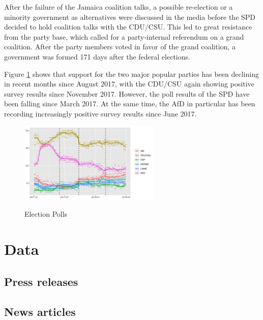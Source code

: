 \documentclass[12pt,a4paper,notitlepage]{article}
\begin{document}
After the failure of the Jamaica coalition talks, a possible re-election or a minority government as alternatives were discussed in the media before the SPD decided to hold coalition talks with the CDU/CSU. This led to great resistance from the party base, which called for a party-internal referendum on a grand coalition. After the party members voted in favor of the grand coalition, a government was formed 171 days after the federal elections. 

Figure \ref{fig_polls} shows that support for the two major popular parties has been declining in recent months since August 2017, with the CDU/CSU again showing positive survey results since November 2017. However, the poll results of the SPD have been falling since March 2017. At the same time, the AfD in particular has been recording increasingly positive survey results since June 2017.  

\begin{figure}[H]
\begin{center}
	\caption{Election Polls}
	\includegraphics[width=0.6\textwidth]{../figs/polldata}
	\label{fig_polls}
	\end{center}
\end{figure}

\section{Data}\label{ch_data}

\subsection{Press releases}

\subsection{News articles}


\end{document}

